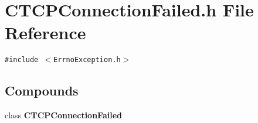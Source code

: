 \section{CTCPConnection\-Failed.h File Reference}
\label{CTCPConnectionFailed_8h}
{\tt \#include $<$Errno\-Exception.h$>$}\par
\subsection*{Compounds}
\begin{CompactItemize}
\item 
class {\bf CTCPConnection\-Failed}
\end{CompactItemize}

